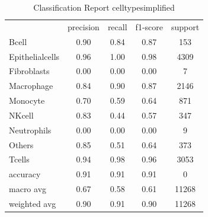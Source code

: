 \begin{table}[htbp]
\centering
\caption{Classification Report celltypesimplified}
\label{tab:classificationreport.celltypesimplified}
\begin{tabular}{lcccc}
 & precision & recall & f1-score & support \\
Bcell & 0.90 & 0.84 & 0.87 & 153 \\
Epithelialcells & 0.96 & 1.00 & 0.98 & 4309 \\
Fibroblasts & 0.00 & 0.00 & 0.00 & 7 \\
Macrophage & 0.84 & 0.90 & 0.87 & 2146 \\
Monocyte & 0.70 & 0.59 & 0.64 & 871 \\
NKcell & 0.83 & 0.44 & 0.57 & 347 \\
Neutrophils & 0.00 & 0.00 & 0.00 & 9 \\
Others & 0.85 & 0.51 & 0.64 & 373 \\
Tcells & 0.94 & 0.98 & 0.96 & 3053 \\
accuracy & 0.91 & 0.91 & 0.91 & 0 \\
macro avg & 0.67 & 0.58 & 0.61 & 11268 \\
weighted avg & 0.90 & 0.91 & 0.90 & 11268 \\
\end{tabular}
\end{table}
